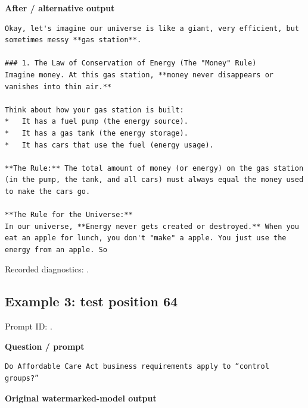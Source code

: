 \textbf{After / alternative output}

\begin{Verbatim}
Okay, let's imagine our universe is like a giant, very efficient, but sometimes messy **gas station**.

### 1. The Law of Conservation of Energy (The "Money" Rule)
Imagine money. At this gas station, **money never disappears or vanishes into thin air.**

Think about how your gas station is built:
*   It has a fuel pump (the energy source).
*   It has a gas tank (the energy storage).
*   It has cars that use the fuel (energy usage).

**The Rule:** The total amount of money (or energy) on the gas station (in the pump, the tank, and all cars) must always equal the money used to make the cars go.

**The Rule for the Universe:**
In our universe, **Energy never gets created or destroyed.** When you eat an apple for lunch, you don't "make" a apple. You just use the energy from an apple. So
\end{Verbatim}

Recorded diagnostics:
\texttt{}.

\subsection{Example 3: test position
64}\label{record-docs-watermarking-qualitative-text-latent-smoothing-md-example-3-test-position-64}

Prompt ID:
\texttt{}.

\textbf{Question / prompt}

\begin{Verbatim}
Do Affordable Care Act business requirements apply to “control groups?”
\end{Verbatim}

\textbf{Original watermarked-model output}

